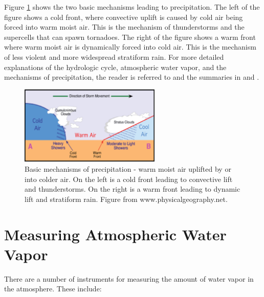 \documentclass[proposal]{umassthesis}
\begin{document}
Figure \ref{fig:cold_warm_fronts} shows the two basic mechanisms leading to precipitation. The left of the figure shows a cold front, where convective uplift is caused by cold air being forced into warm moist air. This is the mechanism of thunderstorms and the supercells that can spawn tornadoes. The right of the figure shows a warm front where warm moist air is dynamically forced into cold air. This is the mechanism of less violent and more widespread stratiform rain. For more detailed explanations of the hydrologic cycle, atmospheric water vapor, and the mechanisms of precipitation, the reader is referred to \cite{barry2009atmosphere} and the summaries in \cite{ming2014} and \cite{doviak1993doppler}. 
\begin{figure}[!h]
\begin{center}
\includegraphics[width = 0.6\textwidth]{cold_warm_fronts}
\caption{Basic mechanisms of precipitation - warm moist air uplifted by or into colder air. On the left is a cold front leading to convective lift and thunderstorms. On the right is a warm front leading to dynamic lift and stratiform rain. Figure from www.physicalgeography.net.}
\label{fig:cold_warm_fronts}
\end{center}
\end{figure}

\section{Measuring Atmospheric Water Vapor}

There are a number of instruments for measuring the amount of water vapor in the atmosphere. These include:
\end{document}

